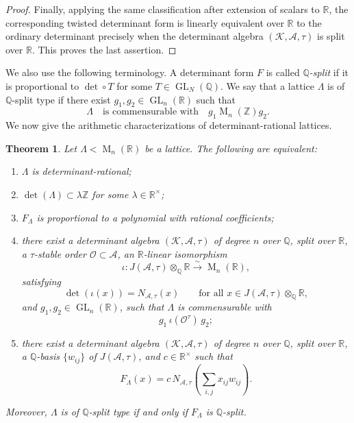 \documentclass[reqno,11pt]{amsart}
\numberwithin{equation}{section}
\newtheorem{theorem}{Theorem}[section]
\theoremstyle{definition}
\theoremstyle{remark}
\newcommand{\op}{\operatorname}
\newcommand{\La}{\Lambda}
\newcommand{\M}{\op{M}}
\newcommand{\GL}{\op{GL}}
\begin{document}
\begin{proof}
Finally, applying the same classification after extension of scalars to
$\mathbb R$, the corresponding twisted determinant form is linearly
equivalent over $\mathbb R$ to the ordinary determinant precisely when
the determinant algebra $(\mathscr K,\mathscr A,\tau)$ is split over
$\mathbb R$. This proves the last assertion.
\end{proof}


 We also use the following terminology. A determinant form $F$ is called \emph{$\mathbb Q$-split} if it is proportional to
$\det\circ T$ for some $T\in\GL_N(\mathbb Q)$. 
We say that a lattice $\Lambda$ is of
$\mathbb Q$-split type if there exist
$g_1,g_2\in\GL_n(\mathbb R)$ such that
$$
\Lambda
\quad\text{is commensurable with}\quad
g_1\M_n(\mathbb Z)g_2.
$$
We now give the arithmetic characterizations of determinant-rational
lattices.

\begin{theorem}
\label{thm:det-rational-characterization}
Let $\Lambda<\M_n(\mathbb R)$ be a lattice. The following are
equivalent:
\begin{enumerate}
\item $\Lambda$ is determinant-rational;
\item $\det(\Lambda)\subset \lambda\mathbb Z$
    for some $\lambda\in\mathbb R^\times$;
\item $F_\Lambda$ is proportional to a polynomial with rational
coefficients;
\item there exist a determinant algebra $(\mathscr{K},\mathscr{A},\tau)$ of degree $n$ over
$\mathbb Q$, split over $\mathbb R$, a $\tau$-stable order
$\mathcal O\subset \mathscr{A}$, an $\mathbb R$-linear isomorphism
$$
    \iota:J(\mathscr{A},\tau)\otimes_{\mathbb Q}\mathbb R
    \xrightarrow{\sim}
    \M_n(\mathbb R),
$$ satisfying
$$
\det(\iota(x))=N_{\mathscr A,\tau}(x)
\qquad
\text{for all }x\in
J(\mathscr A,\tau)\otimes_{\mathbb Q}\mathbb R,
$$
and $g_1,g_2\in\GL_n(\mathbb R)$, such that $\Lambda$ is commensurable
with
$$
    g_1\,\iota(\mathcal O^\tau)\,g_2;
$$
\item there exist a determinant algebra $(\mathscr{K},\mathscr{A},\tau)$ of degree $n$ over
$\mathbb Q$, split over $\mathbb R$, a $\mathbb Q$-basis
$\{w_{ij}\}$ of $J(\mathscr{A},\tau)$,  and $c\in\mathbb R^\times$ such that
$$
    F_\Lambda(x)
    =
    c\,
    N_{\mathscr{A},\tau}\!\left(\sum_{i,j}x_{ij}w_{ij}\right) .
$$

\end{enumerate}
Moreover, $\Lambda$ is of $\mathbb Q$-split type if and only if $F_\La$ is $\mathbb Q$-split.
\end{theorem}
\end{document}
